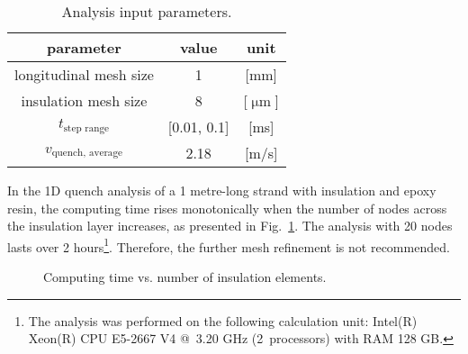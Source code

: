 \begin{table}[H]
    \caption{Analysis input parameters.} 
    \vspace{-1.em} 
    \fontsize{10}{10}
    \selectfont 
    \renewcommand{\arraystretch}{1.5}
    \begin{center}
        \begin{tabular}{ ccc }  
        \hline
        parameter & value & unit \\
        \hline
        longitudinal mesh size & 1 & [mm] \\
        insulation mesh size & 8 & [$\upmu \text{m}$] \\
        $t_\text{step range}$ & [0.01, 0.1] & [ms] \\
        $v_\text{quench, average}$ & 2.18 & [m/s] \\
        \hline 
        \end{tabular}
    \end{center}  
     \label{table: 1d_qv_benchmarking_reference_analysis_settings_with_insulation} 
 \end{table}

In the 1D quench analysis of a 1 metre-long strand with insulation and epoxy resin, the computing time rises monotonically when the number of nodes across the insulation layer increases, as presented in Fig.~\ref{fig: q_vel_modelling_heat_balance_computing_time_with_insulation}. The analysis with 20 nodes lasts over 2 hours\footnote{The analysis was performed on the following calculation unit: Intel(R) Xeon(R) CPU E5-2667 V4 @~3.20 GHz (2~processors) with RAM 128 GB.}. Therefore, the further mesh refinement is not recommended.

\begin{figure}[H]
\centering
    \caption{Computing time vs. number of insulation elements.}
    \label{fig: q_vel_modelling_heat_balance_computing_time_with_insulation}
\end{figure}